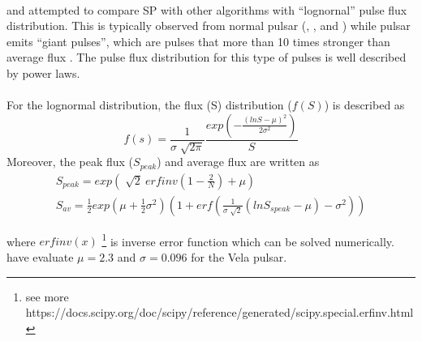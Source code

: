 \documentclass[thesis_msc.tex]{subfiles}
\begin{document}
	\paragraph{} \cite{keane2011transient} and \cite{mclaughlin2003searches} attempted to compare SP with other algorithms with ``lognornal'' pulse flux distribution. This is typically observed from normal pulsar (\cite{cairns2001intrinsic}, \cite{johnston2001high}, and \cite{serylak2009simultaneous}) while pulsar emits ``giant pulses'', which are pulses that more than 10 times stronger than average flux \citep{karuppusamy2010giant}. The pulse flux distribution for this type of pulses is well described by power laws. 
    \paragraph{} For the lognormal distribution, the flux (S) distribution ($f(S)$) is described as 
    \begin{equation}
    f(s)=\frac{1}{\sigma \sqrt[]{2 \pi}} \frac{exp(-\frac{(ln S - \mu)^2}{2 \sigma^2})}{S}    \end{equation}
    Moreover, the peak flux ($S_{peak}$) and average flux are written as 
    \begin{eqnarray}
     S_{peak}=exp(\sqrt[]{2} ~ erfinv(1-\frac{2}{N})+\mu) \label{Speaklog}\\
    S_{av}=\frac{1}{2} exp(\mu+\frac{1}{2} \sigma^2) (1+erf(\frac{1}{\sigma \sqrt[]{2}} (ln S_{speak} - \mu)-\sigma^2)) \label{Savlog}
    \end{eqnarray}
   
where $erfinv(x)$ \footnote{see more https://docs.scipy.org/doc/scipy/reference/generated/scipy.special.erfinv.html} is inverse error function which can be solved numerically. \cite{cairns2001intrinsic} have evaluate $\mu =2.3$ and $\sigma = 0.096$ for the Vela pulsar. %
   
\end{document}
